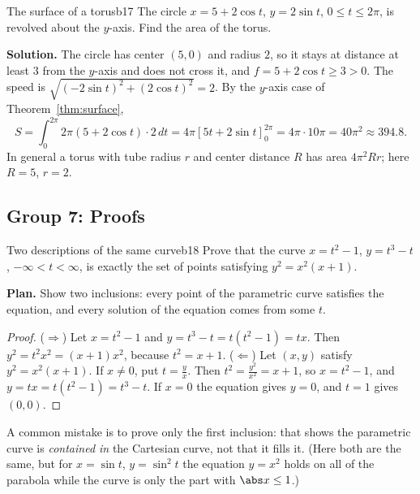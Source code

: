 \documentclass[11pt]{article}
\begin{document}
\begin{exmp}{The surface of a torus}{b17}
The circle $x=5+2\cos t$, $y=2\sin t$, $0\le t\le2\pi$, is revolved about the $y$-axis. Find the area of the torus.

\textbf{Solution.} The circle has center $(5,0)$ and radius $2$, so it stays at distance at least $3$ from the $y$-axis and does not cross it, and $f=5+2\cos t\ge3>0$. The speed is $\sqrt{(-2\sin t)^2+(2\cos t)^2}=2$. By the $y$-axis case of Theorem~\ref{thm:surface},
\[
S=\int_0^{2\pi}2\pi(5+2\cos t)\cdot2\,dt=4\pi\left[5t+2\sin t\right]_0^{2\pi}=4\pi\cdot10\pi=40\pi^2\approx394.8.
\]
In general a torus with tube radius $r$ and center distance $R$ has area $4\pi^2Rr$; here $R=5$, $r=2$.
\end{exmp}

\subsection*{Group 7: Proofs}

\begin{exmp}{Two descriptions of the same curve}{b18}
Prove that the curve $x=t^2-1$, $y=t^3-t$, $-\infty<t<\infty$, is exactly the set of points satisfying $y^2=x^2(x+1)$.

\textbf{Plan.} Show two inclusions: every point of the parametric curve satisfies the equation, and every solution of the equation comes from some $t$.

\begin{proof}
($\Rightarrow$) Let $x=t^2-1$ and $y=t^3-t=t(t^2-1)=tx$. Then $y^2=t^2x^2=(x+1)x^2$, because $t^2=x+1$.
($\Leftarrow$) Let $(x,y)$ satisfy $y^2=x^2(x+1)$. If $x\ne0$, put $t=\frac yx$. Then $t^2=\frac{y^2}{x^2}=x+1$, so $x=t^2-1$, and $y=tx=t(t^2-1)=t^3-t$. If $x=0$ the equation gives $y=0$, and $t=1$ gives $(0,0)$.
\end{proof}
A common mistake is to prove only the first inclusion: that shows the parametric curve is \emph{contained in} the Cartesian curve, not that it fills it. (Here both are the same, but for $x=\sin t$, $y=\sin^2t$ the equation $y=x^2$ holds on all of the parabola while the curve is only the part with $\abs x\le1$.)
\end{exmp}
\end{document}
